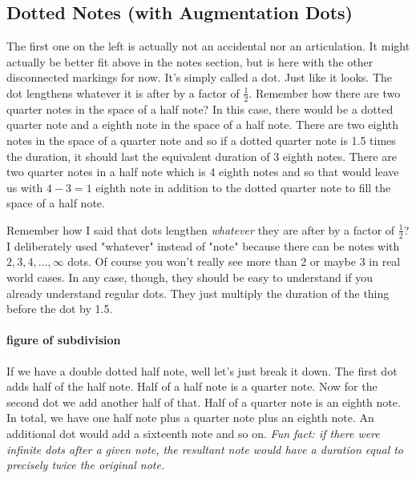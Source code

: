 \documentclass[../OpenAppliedMusicTheory.tex]{subfiles}
\begin{document}
        \subsection{Dotted Notes (with Augmentation Dots)}
        The first one on the left is actually not an accidental nor an articulation. It might actually be better fit above in the notes section, but is here with the other disconnected markings for now. It's simply called a dot. Just like it looks. The dot lengthens whatever it is after by a factor of $\frac{1}{2}$. Remember how there are two quarter notes in the space of a half note? %
        In this case, there would be a dotted quarter note and a eighth note in the space of a half note. There are two eighth notes in the space of a quarter note and so if a dotted quarter note is 1.5 times the duration, it should last the equivalent duration of 3 eighth notes. There are two quarter notes in a half note which is 4 eighth notes and so that would leave us with $4-3=1$ eighth note in addition to the dotted quarter note to fill the space of a half note.

        Remember how I said that dots lengthen \emph{whatever} they are after by a factor of $\frac{1}{2}$? I deliberately used "whatever" instead of "note" because there can be notes with $2, 3, 4, \dots, \infty$ dots. Of course you won't really see more than 2 or maybe 3 in real world cases. In any case, though, they should be easy to understand if you already understand regular dots. They just multiply the duration of the thing before the dot by 1.5. 
        
        \paragraph{figure of subdivision} %

        If we have a double dotted half note, well let's just break it down. The first dot adds half of the half note. Half of a half note is a quarter note. Now for the second dot we add another half of that. Half of a quarter note is an eighth note. In total, we have one half note plus a quarter note plus an eighth note. An additional dot would add a sixteenth note and so on. \emph{Fun fact: if there were infinite dots after a given note, the resultant note would have a duration equal to precisely twice the original note.}

    
\end{document}
